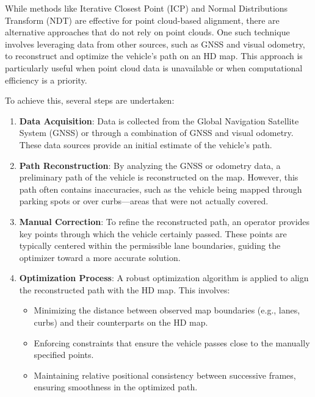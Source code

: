 While methods like Iterative Closest Point (ICP) and Normal Distributions Transform (NDT) are effective for point cloud-based alignment, there are alternative approaches that do not rely on point clouds. One such technique involves leveraging data from other sources, such as GNSS and visual odometry, to reconstruct and optimize the vehicle's path on an HD map. This approach is particularly useful when point cloud data is unavailable or when computational efficiency is a priority.

To achieve this, several steps are undertaken:
\begin{enumerate}
    \item \textbf{Data Acquisition}: Data is collected from the Global Navigation Satellite System (GNSS) or through a combination of GNSS and visual odometry. These data sources provide an initial estimate of the vehicle's path.
    \item \textbf{Path Reconstruction}: By analyzing the GNSS or odometry data, a preliminary path of the vehicle is reconstructed on the map. However, this path often contains inaccuracies, such as the vehicle being mapped through parking spots or over curbs—areas that were not actually covered. 
    \item \textbf{Manual Correction}: To refine the reconstructed path, an operator provides key points through which the vehicle certainly passed. These points are typically centered within the permissible lane boundaries, guiding the optimizer toward a more accurate solution.
    \item \textbf{Optimization Process}: A robust optimization algorithm is applied to align the reconstructed path with the HD map. This involves:
    \begin{itemize}
        \item Minimizing the distance between observed map boundaries (e.g., lanes, curbs) and their counterparts on the HD map.
        \item Enforcing constraints that ensure the vehicle passes close to the manually specified points.
        \item Maintaining relative positional consistency between successive frames, ensuring smoothness in the optimized path.
    \end{itemize}
\end{enumerate}

